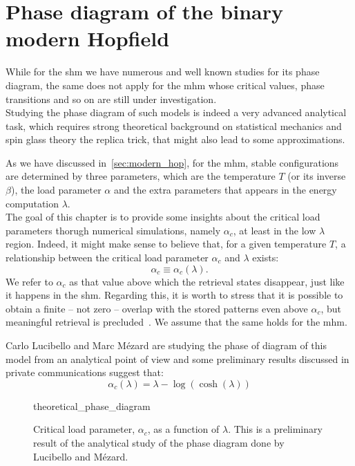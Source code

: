 \documentclass[\rootdir/main.tex]{subfiles}
\begin{document}
\chapter{Phase diagram of the binary modern Hopfield}\label{chap:phase_diagram}
While for the \acrlong{shm} we have numerous and well known studies for its phase diagram, the same does not apply for the \acrlong{mhm} whose critical values, phase transitions and so on are still under investigation.\\
Studying the phase diagram of such models is indeed a very advanced analytical task, which requires strong theoretical background on statistical mechanics and spin glass theory \eg the replica trick, that might also lead to some approximations.

As we have discussed in~\cref{sec:modern_hop}, for the \acrlong{mhm}, stable configurations are determined by three parameters, which are the temperature $T$ (or its inverse $\beta$), the load parameter $\alpha$ and the extra parameters that appears in the energy computation $\lambda$.\\
The goal of this chapter is to provide some insights about the critical load parameters thorugh numerical simulations, namely $\alpha_c$, at least in the low $\lambda$ region. Indeed, it might make sense to believe that, for a given temperature $T$, a relationship between the critical load parameter $\alpha_c$ and $\lambda$ exists:
\begin{equation}
    \alpha_c \equiv \alpha_c\left(\lambda\right).
\end{equation}
We refer to $\alpha_c$ as that value above which the retrieval states disappear, just like it happens in the \acrlong{shm}. Regarding this, it is worth to stress that it is possible to obtain a finite -- \ie not zero -- overlap with the stored patterns even above $\alpha_c$, but meaningful retrieval is precluded~\cite{amit_phase}. We assume that the same holds for the \acrlong{mhm}.

Carlo Lucibello and Marc Mézard are studying the phase of diagram of this model from an analytical point of view and some preliminary results discussed in private communications suggest that:
\begin{equation}\label{eq:preliminary_phase_diagram}
    \alpha_c\left( \lambda \right) = \lambda - \log \left( \cosh\left( \lambda \right) \right)
\end{equation}
\begin{figure}
    \centering
    {theoretical_phase_diagram}
    \caption{Critical load parameter, $\alpha_c$, as a function of $\lambda$. This is a preliminary result of the analytical study of the phase diagram done by Lucibello and Mézard.}
\end{figure}
\end{document}
